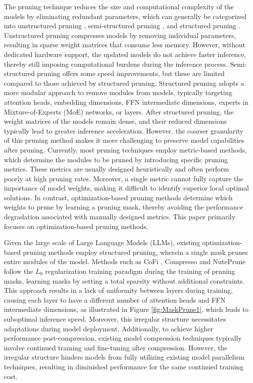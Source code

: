The pruning technique reduces the size and computational complexity of the models by eliminating redundant parameters, which can generally be categorized into unstructured pruning \citep{frantar2023sparsegpt, sun2023wanda, dong2024pruner}, semi-structured pruning \citep{mishra2021accelerating}, and structured pruning \citep{ma2023llm, xia2023sheared, an2023fluctuationbased}. Unstructured pruning compresses models by removing individual parameters, resulting in sparse weight matrices that consume less memory. However, without dedicated hardware support, the updated models do not achieve faster inference, thereby still imposing computational burdens during the inference process. Semi-structured pruning offers some speed improvements, but these are limited compared to those achieved by structured pruning. Structured pruning adopts a more modular approach to remove modules from models, typically targeting attention heads, embedding dimensions, FFN intermediate dimensions, experts in Mixture-of-Experts (MoE) networks, or layers. After structured pruning, the weight matrices of the models remain dense, and their reduced dimensions typically lead to greater inference acceleration. However, the coarser granularity of this pruning method makes it more challenging to preserve model capabilities after pruning. Currently, most pruning techniques employ metric-based methods, which determine the modules to be pruned by introducing specific pruning metrics. These metrics are usually designed heuristically and often perform poorly at high pruning rates. Moreover, a single metric cannot fully capture the importance of model weights, making it difficult to identify superior local optimal solutions. In contrast, optimization-based pruning methods determine which weights to prune by learning a pruning mask, thereby avoiding the performance degradation associated with manually designed metrics. This paper primarily focuses on optimization-based pruning methods.

Given the large scale of Large Language Models (LLMs), existing optimization-based pruning methods employ structured pruning, wherein a single mask prunes entire modules of the model. Methods such as CoFi \citep{xia2022structured}, Compresso \citep{guo2023compresso} and NutePrune \citep{li2024nuteprune} follow the $L_0$ regularization \citep{louizos2018learning} training paradigm during the training of pruning masks, learning masks by setting a total sparsity without additional constraints. This approach results in a lack of uniformity between layers during training, causing each layer to have a different number of attention heads and FFN intermediate dimensions, as illustrated in Figure \ref{fig:MaskPrune1}, which leads to suboptimal inference speed. Moreover, this irregular structure necessitates adaptations during model deployment. Additionally, to achieve higher performance post-compression, existing model compression techniques typically involve continued training and fine-tuning after compression. However, the irregular structure hinders models from fully utilizing existing model parallelism techniques, resulting in diminished performance for the same continued training cost\citep{xia2023sheared}.

